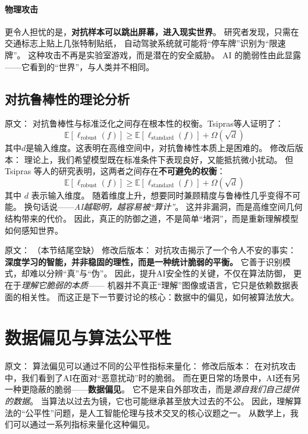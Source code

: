 \paragraph{物理攻击}  
更令人担忧的是，\textbf{对抗样本可以跳出屏幕，进入现实世界}。  
研究者发现，只需在交通标志上贴上几张特制贴纸，  
自动驾驶系统就可能将“停车牌”识别为“限速牌”。  
这种攻击不再是实验室游戏，而是潜在的安全威胁。  
AI 的脆弱性由此显露——它看到的“世界”，与人类并不相同。



\subsection{对抗鲁棒性的理论分析}

原文：
对抗鲁棒性与标准泛化之间存在根本性的权衡。Tsipras等人证明了：
$$\mathbb{E}[\ell_{\text{robust}}(f)] \geq \mathbb{E}[\ell_{\text{standard}}(f)] + \Omega(\sqrt{d})$$
其中$d$是输入维度。这表明在高维空间中，对抗鲁棒性本质上是困难的。
修改后版本：
理论上，我们希望模型既在标准条件下表现良好，又能抵抗微小扰动。  
但 Tsipras 等人的研究表明，这两者之间存在\textbf{不可避免的权衡}：  
$$\mathbb{E}[\ell_{\text{robust}}(f)] \geq \mathbb{E}[\ell_{\text{standard}}(f)] + \Omega(\sqrt{d})$$  
其中 $d$ 表示输入维度。  
随着维度上升，想要同时兼顾精度与鲁棒性几乎变得不可能。  
换句话说——\textit{AI越聪明，越容易被“算计”}。  
这并非漏洞，而是高维空间几何结构带来的代价。  
因此，真正的防御之道，不是简单“堵洞”，而是重新理解模型如何感知世界。



原文：
（本节结尾空缺）
修改后版本：
对抗攻击揭示了一个令人不安的事实：  
\textbf{深度学习的智能，并非稳固的理性，而是一种统计脆弱的平衡。}  
它善于识别模式，却难以分辨“真”与“伪”。  
因此，提升AI安全性的关键，不仅在算法防御，  
更在于\textit{理解它脆弱的本质}——  
机器并不真正“理解”图像或语言，它只是依赖数据表面的相关性。  
而这正是下一节要讨论的核心：数据中的偏见，如何被算法放大。


\section{数据偏见与算法公平性}

原文：
算法偏见可以通过不同的公平性指标来量化：
修改后版本：
在对抗攻击中，我们看到了AI在面对“恶意扰动”时的脆弱。  
而在更日常的场景中，AI还有另一种更隐蔽的脆弱——\textbf{数据偏见}。  
它不是来自外部攻击，而是\textit{源自我们自己提供的数据}。  
当算法以过去为镜，它也可能继承甚至放大过去的不公。  
因此，理解算法的“公平性”问题，是人工智能伦理与技术交叉的核心议题之一。  
从数学上，我们可以通过一系列指标来量化这种偏见。




